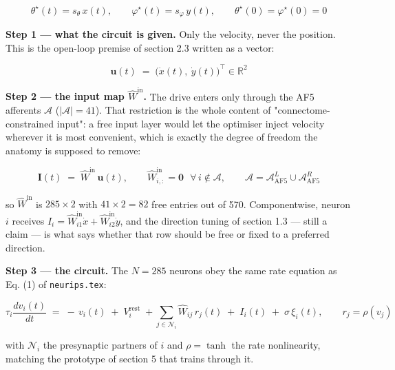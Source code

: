 \documentclass[10pt]{article}
\begin{document}
\begin{equation}
\label{eq:world-scale}
\theta^{\star}(t) = s_\theta\, x(t),
\qquad
\varphi^{\star}(t) = s_\varphi\, y(t),
\qquad
\theta^{\star}(0)=\varphi^{\star}(0)=0
\end{equation}

\textbf{Step 1 --- what the circuit is given.} Only the velocity, never the position. This
is the open-loop premise of section 2.3 written as a vector:

\begin{equation}
\label{eq:input-vector}
\mathbf{u}(t) \;=\; \big(\dot x(t),\ \dot y(t)\big)^{\!\top} \in \mathbb{R}^{2}
\end{equation}

\textbf{Step 2 --- the input map $\hat W^{\mathrm{in}}$.} The drive enters only through the
AF5 afferents $\mathcal{A}$ ($|\mathcal{A}|=41$). That restriction is the whole content of
"connectome-constrained input": a free input layer would let the optimiser inject velocity
wherever it is most convenient, which is exactly the degree of freedom the anatomy is
supposed to remove:

\begin{equation}
\label{eq:input-map}
\mathbf{I}(t) \;=\; \hat W^{\mathrm{in}}\,\mathbf{u}(t),
\qquad
\hat W^{\mathrm{in}}_{i,:} = \mathbf{0}\ \ \ \forall\, i\notin\mathcal{A},
\qquad \mathcal{A}=\mathcal{A}_{\mathrm{AF5}}^{L}\cup\mathcal{A}_{\mathrm{AF5}}^{R}
\end{equation}

so $\hat W^{\mathrm{in}}$ is $285\times 2$ with $41\times 2 = 82$ free entries out of 570.
Componentwise, neuron $i$ receives $I_i = \hat W^{\mathrm{in}}_{i1}\dot x + \hat
W^{\mathrm{in}}_{i2}\dot y$, and the direction tuning of section 1.3 --- still a claim ---
is what says whether that row should be free or fixed to a preferred direction.

\textbf{Step 3 --- the circuit.} The $N=285$ neurons obey the same rate equation as Eq. (1)
of \texttt{neurips.tex}:

\begin{equation}
\label{eq:circuit}
\tau_i\frac{d v_i(t)}{dt} \;=\; -\,v_i(t) \;+\; V_i^{\mathrm{rest}}
\;+\!\!\sum_{j\in\mathcal{N}_i}\!\! \hat{W}_{ij}\,r_j(t)
\;+\; I_i(t) \;+\; \sigma\,\xi_i(t),
\qquad r_j=\rho(v_j)
\end{equation}

with $\mathcal{N}_i$ the presynaptic partners of $i$ and $\rho=\tanh$ the rate
nonlinearity, matching the prototype of section 5 that trains through it.
\end{document}
